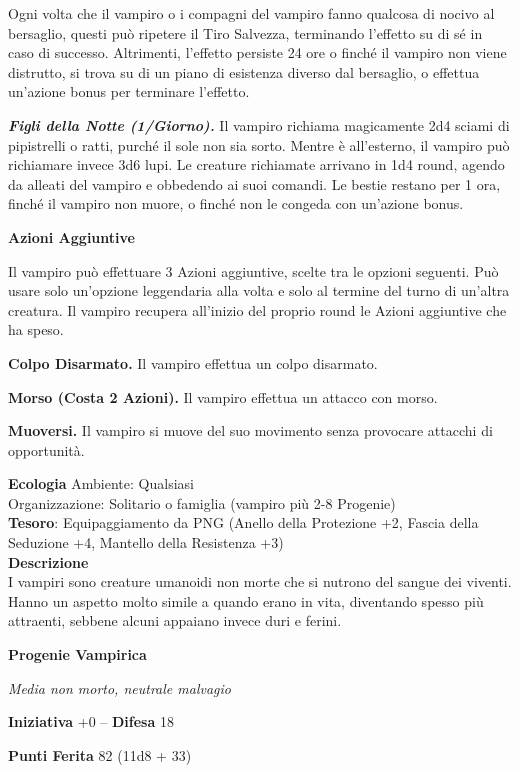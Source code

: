 \begin{multicols}{2}
	Ogni volta che il vampiro o i compagni del vampiro fanno qualcosa di nocivo al bersaglio, questi può ripetere il Tiro Salvezza, terminando l'effetto su di sé in caso di successo. Altrimenti, l'effetto persiste 24 ore o finché il vampiro non viene distrutto, si trova su di un piano di esistenza diverso dal bersaglio, o effettua un'azione bonus per terminare l'effetto.

	\textit{\textbf{Figli della Notte (1/Giorno).}} Il vampiro richiama magicamente 2d4 sciami di pipistrelli o ratti, purché il sole non sia sorto. Mentre è all'esterno, il vampiro può richiamare invece 3d6 lupi. Le creature richiamate arrivano in 1d4 round, agendo da alleati del vampiro e obbedendo ai suoi comandi. Le bestie restano per 1 ora, finché il vampiro non muore, o finché non le congeda con un'azione bonus.

	\textbf{Azioni Aggiuntive}

	Il vampiro può effettuare 3 Azioni aggiuntive, scelte tra le opzioni seguenti. Può usare solo un'opzione leggendaria alla volta e solo al termine del turno di un'altra creatura. Il vampiro recupera all'inizio del proprio round le Azioni aggiuntive che ha speso.

	\textbf{Colpo Disarmato.} Il vampiro effettua un colpo disarmato.

	\textbf{Morso (Costa 2 Azioni).} Il vampiro effettua un attacco con morso.

	\textbf{Muoversi.} Il vampiro si muove del suo movimento senza provocare attacchi di opportunità.

	\textbf{Ecologia}
	Ambiente: Qualsiasi\\
	Organizzazione: Solitario o famiglia (vampiro più 2-8 Progenie)\\
	\textbf{Tesoro}: Equipaggiamento da PNG (Anello della Protezione +2, Fascia della Seduzione +4, Mantello della Resistenza +3)\\
	\textbf{Descrizione}\\
	I vampiri sono creature umanoidi non morte che si nutrono del sangue dei viventi. Hanno un aspetto molto simile a quando erano in vita, diventando spesso più attraenti, sebbene alcuni appaiano invece duri e ferini.


	\medskip{}\textbf{Progenie Vampirica}

	\textit{Media non morto, neutrale malvagio}

	\textbf{Iniziativa} +0 -- \textbf{Difesa} 18

	\textbf{Punti Ferita} 82 (11d8 + 33)


\end{multicols}
